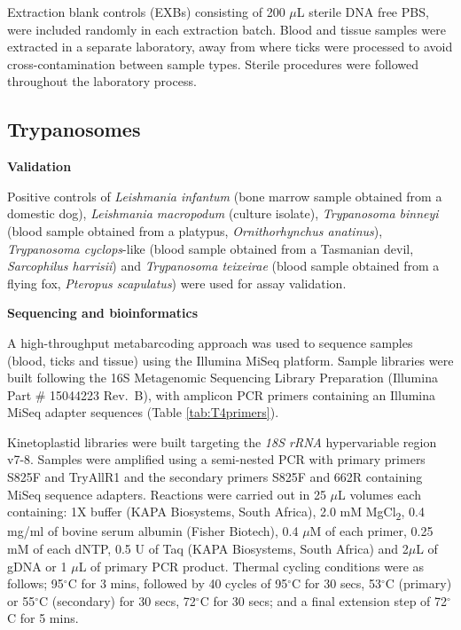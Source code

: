 \documentclass[a4paper, nobind]{templates/ociamthesis}
\begin{document}
Extraction blank controls (EXBs) consisting of 200 \(\mu\)L sterile DNA free PBS, were included randomly in each extraction batch. Blood and tissue samples were extracted in a separate laboratory, away from where ticks were processed to avoid cross-contamination between sample types. Sterile procedures were followed throughout the laboratory process.

\hypertarget{trypanosomes}{%
\subsection{Trypanosomes}\label{trypanosomes}}

\textbf{Validation}

Positive controls of \emph{Leishmania infantum} (bone marrow sample obtained from a domestic dog), \emph{Leishmania macropodum} (culture isolate), \emph{Trypanosoma binneyi} (blood sample obtained from a platypus, \emph{Ornithorhynchus anatinus}), \emph{Trypanosoma cyclops}-like (blood sample obtained from a Tasmanian devil, \emph{Sarcophilus harrisii}) and \emph{Trypanosoma teixeirae} (blood sample obtained from a flying fox, \emph{Pteropus scapulatus}) were used for assay validation.

\textbf{Sequencing and bioinformatics}

A high-throughput metabarcoding approach was used to sequence samples (blood, ticks and tissue) using the Illumina MiSeq platform. Sample libraries were built following the 16S Metagenomic Sequencing Library Preparation (Illumina Part \# 15044223 Rev.~B), with amplicon PCR primers containing an Illumina MiSeq adapter sequences (Table \ref{tab:T4primers}).

Kinetoplastid libraries were built targeting the \emph{18S rRNA} hypervariable region v7-8. Samples were amplified using a semi-nested PCR with primary primers S825F and TryAllR1 \autocite{maslovPhylogenyTrypanosomesInferred1996,barbosaIncreasedGeneticDiversity2017} and the secondary primers S825F and 662R \autocite{maslovPhylogenyTrypanosomesInferred1996} containing MiSeq sequence adapters.
Reactions were carried out in 25 \(\mu\)L volumes each containing: 1X buffer (KAPA Biosystems, South Africa), 2.0 mM MgCl\textsubscript{2}, 0.4 mg/ml of bovine serum albumin (Fisher Biotech), 0.4 \(\mu\)M of each primer, 0.25 mM of each dNTP, 0.5 U of Taq (KAPA Biosystems, South Africa) and 2\(\mu\)L of gDNA or 1 \(\mu\)L of primary PCR product.
Thermal cycling conditions were as follows; 95\(^\circ\)C for 3 mins, followed by 40 cycles of 95\(^\circ\)C for 30 secs, 53\(^\circ\)C (primary) or 55\(^\circ\)C (secondary) for 30 secs, 72\(^\circ\)C for 30 secs; and a final extension step of 72\(^\circ\)C for 5 mins.
\end{document}
